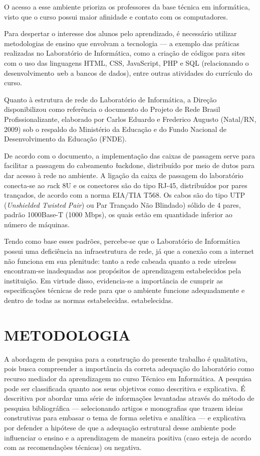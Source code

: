 \documentclass[12pt, openright, oneside, a4paper, brazil]{abntex2}
\begin{document}
	O acesso a esse ambiente prioriza os professores da base técnica em informática, visto que o curso possui maior afinidade e contato com os computadores.

	Para despertar o interesse dos alunos pelo aprendizado, é necessário utilizar metodologias de ensino que envolvam a tecnologia — a exemplo das práticas realizadas no Laboratório de Informática, como a criação de códigos para sites com o uso das linguagens HTML, CSS, JavaScript, PHP e SQL (relacionando o desenvolvimento {\textit web} a bancos de dados), entre outras atividades do currículo do curso.

	Quanto à estrutura de rede do Laboratório de Informática, a Direção disponibilizou como referência o documento do Projeto de Rede Brasil Profissionalizante, elaborado por Carlos Eduardo e Frederico Augusto (Natal/RN, 2009) sob o respaldo do Ministério da Educação e do Fundo Nacional de Desenvolvimento da Educação (FNDE).

	De acordo com o documento, a implementação das caixas de passagem serve para facilitar a passagem do cabeamento {\textit backdone}, distribuído por meio de dutos para dar acesso à rede no ambiente. A ligação da caixa de passagem do laboratório conecta-se ao {\textit rack} 8U e os conectores são do tipo RJ-45, distribuídos por pares trançados, de acordo com a norma EIA/TIA T568. Os cabos são do tipo UTP (\textit{Unshielded Twisted Pair}) ou Par Trançado Não Blindado) sólido de 4 pares, padrão 1000Base-T (1000 Mbps), os quais estão em quantidade inferior ao número de máquinas.

	Tendo como base esses padrões, percebe-se que o Laboratório de Informática possui uma deficiência na infraestrutura de rede, já que a conexão com a internet não funciona em sua plenitude: tanto a rede cabeada quanto a rede {\textit wireless} encontram-se inadequadas aos propósitos de aprendizagem estabelecidos pela instituição. Em virtude disso, evidencia-se a importância de cumprir as especificações técnicas de rede para que o ambiente funcione adequadamente e dentro de todas as normas estabelecidas. estabelecidas.

\chapter{METODOLOGIA}

	A abordagem de pesquisa para a construção do presente trabalho é qualitativa, pois busca compreender a importância da correta adequação do laboratório como recurso mediador da aprendizagem no curso Técnico em Informática. A pesquisa pode ser classificada quanto aos seus objetivos como descritiva e explicativa. É descritiva por abordar uma série de informações levantadas através do método de pesquisa bibliográfica — selecionando artigos e monografias que trazem ideias construtivas para embasar o tema de forma seletiva e analítica — e explicativa por defender a hipótese de que a adequação estrutural desse ambiente pode influenciar o ensino e a aprendizagem de maneira positiva (caso esteja de acordo com as recomendações técnicas) ou negativa.
\end{document}
